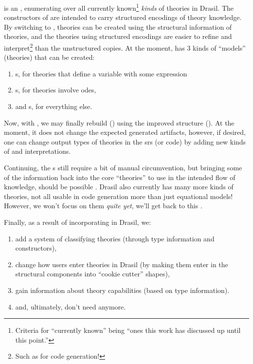 \originalNewModelKindsHaskell{}

\ModelKinds{} is an , enumerating over all currently
known\footnote{Criteria for ``currently known'' being ``ones this work has
discussed up until this point.''} \textit{kinds} of theories in Drasil. The
constructors of \ModelKinds{} are intended to carry structured encodings of
theory knowledge. By switching to \ModelKinds{}, theories can be created using
the structural information of theories, and the theories using structured
encodings are easier to refine and interpret\footnote{Such as for code
generation!} than the unstructured copies. At the moment, \ModelKinds{} has 3
kinds of ``models'' (theories) that can be created:

\begin{enumerate}
    \item \EquationalModel{}s, for theories that define a variable with some
          expression
    \item \DEModel{}s, for theories involve \acsp{ode},
    \item and \OthModel{}s, for everything else.
\end{enumerate}

Now, with \EquationalModel{}, we may finally rebuild 
() using the improved structure
(). At the moment, it does not change the expected
generated artifacts, however, if desired, one can change output types of
theories in the \acs{srs} (or code) by adding new kinds of \QDefinition{} and
\ModelKinds{} interpretations.

\currentLandPosIMQD{}

Continuing, the \DEModel{}s still require a bit of manual circumvention, but
bringing some of the information back into the core ``theories'' to use in the
intended flow of knowledge, should be possible \cite{Chen2022MEng}. Drasil also
currently has many more kinds of theories, not all usable in code generation
\textemdash{} more than just equational models! However, we won't focus on them
\textit{quite yet}, we'll get back to this .

Finally, as a result of incorporating \ModelKinds{} in Drasil, we:
\begin{enumerate}[label={(\alph*)}]
    \item add a system of classifying theories (through type information and
          constructors),
    \item change how users enter theories in Drasil (by making them enter in the
          structural components into ``cookie cutter'' shapes),
    \item gain information about theory capabilities (based on type
          information).
    \item and, ultimately, don't need \relToQD{} anymore.
\end{enumerate}

